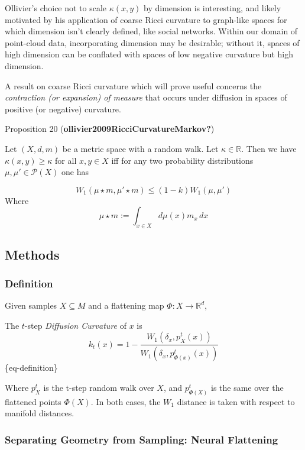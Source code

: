 \documentclass[
  letterpaper,
  DIV=11,
  numbers=noendperiod]{scrartcl}
\begin{document}
Ollivier's choice not to scale \(\kappa(x,y)\) by dimension is
interesting, and likely motivated by his application of coarse Ricci
curvature to graph-like spaces for which dimension isn't clearly
defined, like social networks. Within our domain of point-cloud data,
incorporating dimension may be desirable; without it, spaces of high
dimension can be conflated with spaces of low negative curvature but
high dimension.

A result on coarse Ricci curvature which will prove useful concerns the
\emph{contraction (or expansion) of measure} that occurs under diffusion
in spaces of positive (or negative) curvature.

Proposition 20 (\textbf{ollivier2009RicciCurvatureMarkov?})

Let \((X,d,m)\) be a metric space with a random walk. Let
\(\kappa \in \mathbb{R}\). Then we have \(\kappa(x,y) \geq \kappa\) for
all \(x,y \in X\) iff for any two probability distributions
\(\mu, \mu' \in \mathcal{P}(X)\) one has

\[
W_{1}(\mu \star m, \mu' \star m) \leq (1-k)W_{1}(\mu, \mu')
\] Where \[
 \mu \star m := \int_{{x \in X}} d\mu(x)m_{x} \, dx
\]

\subsection{Methods}\label{methods}

\subsubsection{Definition}\label{definition}

Given samples \(X \subseteq M\) and a flattening map
\(\Phi: X \rightarrow \mathbb{R}^d\),

The \(t\)-step \emph{Diffusion Curvature} of \(x\) is \[
k_t(x)=1-\frac{W_1\left(\delta_x, p_X^t(x)\right)}{W_1\left(\delta_x, p_{\Phi(x)}^t(x)\right)}
\]\{eq-definition\}

Where \(p_X^t\) is the t-step random walk over \(X\), and
\(p_{\Phi(X)}^t\) is the same over the flattened points \(\Phi(X)\). In
both cases, the \(W_1\) distance is taken with respect to manifold
distances.

\subsubsection{Separating Geometry from Sampling: Neural
Flattening}\label{separating-geometry-from-sampling-neural-flattening}
\end{document}

